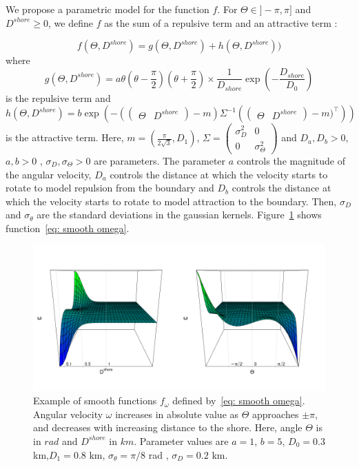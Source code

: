 \documentclass[aoas]{imsart}
\theoremstyle{definition}
\theoremstyle{remark}
\theoremstyle{remark}
\newcommand {\1}{\mathbb{1}}
\begin{document}
We propose a parametric model for the function $f$. For $\Theta \in ]-\pi,\pi]$ and $D^{shore} \geq 0$, we define $f$ as the sum of a repulsive term and an attractive term :

\begin{equation}
	\label{eq: smooth omega}
	f(\Theta,D^{shore})=g(\Theta,D^{shore})+h(\Theta,D^{shore}))
\end{equation}
where 
\[g(\Theta,D^{shore})=a\theta\left(\theta-\frac{\pi}{2}\right)\left(\theta+\frac{\pi}{2}\right)\times \frac{1}{D_{shore}}\exp\left(-\frac{D_{shore}}{D_0}\right)\]is the repulsive term and \[h(\Theta,D^{shore})=b\exp\left(-\left(\begin{pmatrix} \Theta & D^{shore} \end{pmatrix}-m\right) \Sigma^{-1} \left(\begin{pmatrix} \Theta & D^{shore}\end{pmatrix}-m)^\top \right)\right)\]
is the attractive term. Here, $ m=(\frac{\pi}{2\sqrt{3}},D_1)$, $\Sigma=\begin{pmatrix} \sigma_D^2 & 0 \\ 0 & \sigma_\Theta^2\end{pmatrix}$ and $D_a,D_b>0$, $a,b>0$ , $\sigma_D,\sigma_\Theta >0$ are parameters.
The parameter $a$ controls the magnitude of the angular velocity, $D_a$ controls the distance at which the velocity starts to rotate to model repulsion from the boundary and $D_b$ controls the distance at which the velocity starts to rotate to model attraction to the boundary. Then, $ \sigma_D$ and $\sigma_\theta$ are the standard deviations in the gaussian kernels. Figure~\ref{fig: perspectiveplots}  shows function~\eqref{eq: smooth omega}.

\begin{figure}[ht!]
	\centering
		\includegraphics[scale=0.4]{images/crcvm/perspective_plots.png}
		

\caption{Example of smooth functions $f_{\omega}$ defined by~\eqref{eq: smooth omega}. Angular velocity $\omega$ increases in absolute value as $\Theta$ approaches $\pm\pi$, and decreases with increasing distance to the shore.  Here, angle $\Theta$ is in $rad$ and $D^{shore}$ in $km$. Parameter values are $a=1$, $b=5$, $D_0=0.3$ km,$D_1=0.8$ km, $\sigma_{\theta}=\pi/8$ rad , $\sigma_D=0.2$ km.}
\label{fig: perspectiveplots}
	
\end{figure}
\end{document}
